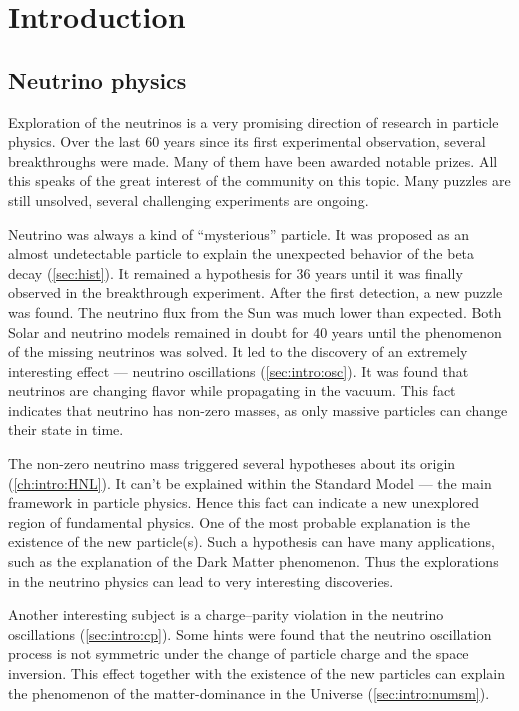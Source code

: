 \documentclass[../main.tex]{subfiles}
\begin{document}
\renewcommand{\labelitemi}{\ding{226}}
\renewcommand{\labelitemii}{\ding{227}}


\part{Introduction}
\label{part:intro:general}

\chapter{Neutrino physics}
\label{ch:nu_phys}
Exploration of the neutrinos is a very promising direction of research in particle physics. Over the last 60 years since its first experimental observation, several breakthroughs were made. Many of them have been awarded notable prizes. All this speaks of the great interest of the community on this topic. Many puzzles are still unsolved, several challenging experiments are ongoing.

Neutrino was always a kind of ``mysterious'' particle. It was proposed as an almost undetectable particle to explain the unexpected behavior of the beta decay (\autoref{sec:hist}). It remained a hypothesis for 36 years until it was finally observed in the breakthrough experiment. After the first detection, a new puzzle was found. The neutrino flux from the Sun was much lower than expected. Both Solar and neutrino models remained in doubt for 40 years until the phenomenon of the missing neutrinos was solved. It led to the discovery of an extremely interesting effect --- neutrino oscillations (\autoref{sec:intro:osc}). It was found that neutrinos are changing flavor while propagating in the vacuum. This fact indicates that neutrino has non-zero masses, as only massive particles can change their state in time.

The non-zero neutrino mass triggered several hypotheses about its origin (\autoref{ch:intro:HNL}). It can't be explained within the Standard Model --- the main framework in particle physics. Hence this fact can indicate a new unexplored region of fundamental physics. One of the most probable explanation is the existence of the new particle(s). Such a hypothesis can have many applications, such as the explanation of the Dark Matter phenomenon. Thus the explorations in the neutrino physics can lead to very interesting discoveries.

Another interesting subject is a charge--parity violation in the neutrino oscillations (\autoref{sec:intro:cp}). Some hints were found that the neutrino oscillation process is not symmetric under the change of particle charge and the space inversion. This effect together with the existence of the new particles can explain the phenomenon of the matter-dominance in the Universe (\autoref{sec:intro:numsm}).
\end{document}
